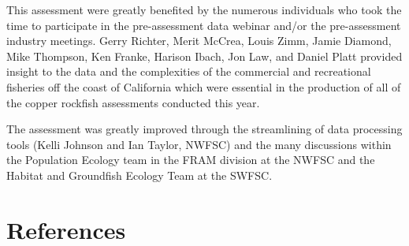 \documentclass[11pt,
  english,
  letterpaper,
]{article}
\begin{document}
This assessment were greatly benefited by the numerous individuals who took the time to participate in the pre-assessment data webinar and/or the pre-assessment industry meetings. Gerry Richter, Merit McCrea, Louis Zimm, Jamie Diamond, Mike Thompson, Ken Franke, Harison Ibach, Jon Law, and Daniel Platt provided insight to the data and the complexities of the commercial and recreational fisheries off the coast of California which were essential in the production of all of the copper rockfish assessments conducted this year.

The assessment was greatly improved through the streamlining of data processing tools (Kelli Johnson and Ian Taylor, NWFSC) and the many discussions within the Population Ecology team in the FRAM division at the NWFSC and the Habitat and Groundfish Ecology Team at the SWFSC.

\clearpage

\hypertarget{references}{%
\section{References}\label{references}}
\end{document}
